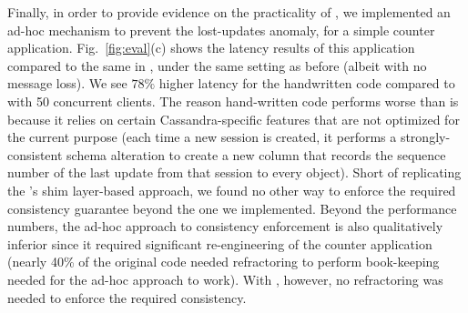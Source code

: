 Finally, in order to provide evidence on the practicality of \tool, we
implemented an ad-hoc mechanism to prevent the lost-updates anomaly,
for a simple counter application. Fig.~\ref{fig:eval}(c) shows the
latency results of this application compared to the same in \tool,
under the same setting as before (albeit with no message loss).  We
see $78\%$ higher latency for the handwritten code compared to \tool
with 50 concurrent clients. The reason hand-written code performs
worse than \tool is because it relies on certain Cassandra-specific
features that are not optimized for the current purpose (each time a
new session is created, it performs a strongly-consistent schema
alteration to create a new column that records the sequence number of
the last update from that session to every object).  Short of
replicating the \tool's shim layer-based approach, we found no other
way to enforce the required consistency guarantee beyond the one we
implemented. Beyond the performance numbers, the ad-hoc approach to
consistency enforcement is also qualitatively inferior since it
required significant re-engineering of the counter application (nearly
40\% of the original code needed refractoring to perform book-keeping needed
for the ad-hoc approach to work). With \tool, however, no refractoring
was needed to enforce the required consistency.










































